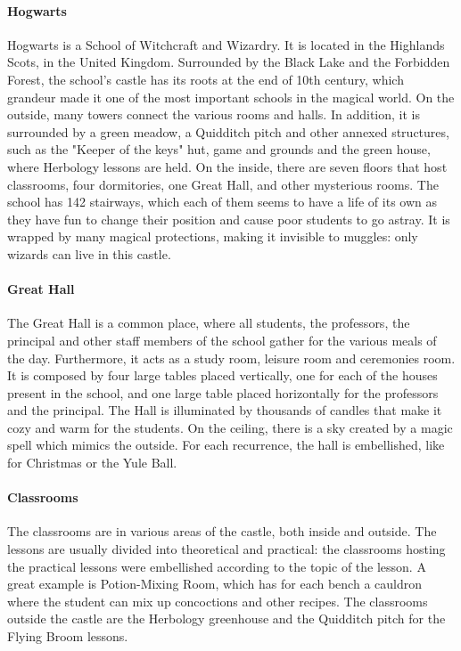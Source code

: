 \paragraph{Hogwarts}
Hogwarts is a School of Witchcraft and Wizardry. It is located in the Highlands Scots, in the United Kingdom. Surrounded by the Black Lake and the Forbidden Forest, the school's castle has its roots at the end of 10th century, which grandeur made it one of the most important schools in the magical world. On the outside, many towers connect the various rooms and halls. In addition, it is surrounded by a green meadow, a Quidditch pitch and other annexed structures, such as the "Keeper of the keys" hut, game and grounds and the green house, where Herbology lessons are held. On the inside, there are seven floors that host classrooms, four dormitories, one Great Hall, and other mysterious rooms. The school has 142 stairways, which each of them seems to have a life of its own as they have fun to change their position and cause poor students to go astray. It is wrapped by many magical protections, making it invisible to muggles: only wizards can live in this castle. 

\paragraph{Great Hall}
The Great Hall is a common place, where all students, the professors, the principal and other staff members of the school gather for the various meals of the day. Furthermore, it acts as a study room, leisure room and ceremonies room. It is composed by four large tables placed vertically, one for each of the houses present in the school, and one large table placed horizontally for the professors and the principal. The Hall is illuminated by thousands of candles that make it cozy and warm for the students. On the ceiling, there is a sky created by a magic spell which mimics the outside. For each recurrence, the hall is embellished, like for Christmas or the Yule Ball. 

\paragraph{Classrooms}
The classrooms are in various areas of the castle, both inside and outside. The lessons are usually divided into theoretical and practical: the classrooms hosting the practical lessons were embellished according to the topic of the lesson. A great example is Potion-Mixing Room, which has for each bench a cauldron where the student can mix up concoctions and other recipes. The classrooms outside the castle are the Herbology greenhouse and the Quidditch pitch for the Flying Broom lessons. 

